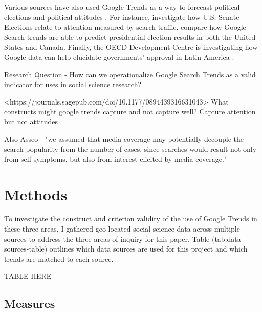 Various sources have also used Google Trends as a way to forecast
political elections and political attitudes
\citep{wolfTrendingRightDirection2018}. For instance,
\citet{swearingenGoogleInsightsSenate2014} investigate how U.S. Senate
Elections relate to attention measured by search traffic.
\citet{prado-romanGoogleTrendsPredictor2020} compare how Google Search trends
are able to predict presidential election results in both the United
States and Canada. Finally, the OECD Development Centre is investigating
how Google data can help elucidate governments' approval in Latin
America \citep{montoyaUsingGoogleData2020}.

Research Question - How can we operationalize Google Search Trends as a
valid indicator for uses in social science research?

<https://journals.sagepub.com/doi/10.1177/0894439316631043> What
constructs might google trends capture and not capture well? Capture
attention but not attitudes

Also Asseo - "we assumed that media coverage may potentially decouple
the search popularity from the number of cases, since searches would
result not only from self-symptoms, but also from interest elicited by
media coverage."

\section{Methods}
To investigate the construct and criterion validity of the use of Google Trends
in these three areas, I gathered geo-located social science data across multiple
sources to address the three areas of inquiry for this paper.  Table
\@ref(tab:data-sources-table) outlines which data sources are used for this
project and which trends are matched to each source.

TABLE HERE

\subsection{Measures}

